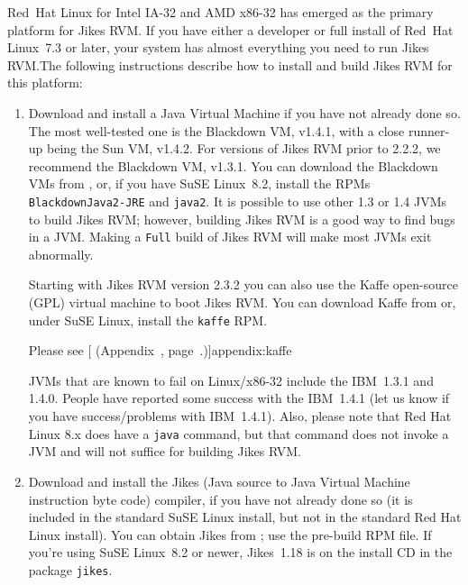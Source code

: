 Red~Hat\TMboth{} Linux\Rboth{} for Intel\Rboth{} IA-32 and AMD\Rboth{} x86-32 has emerged as the 
primary platform for Jikes\TMweb{} RVM.\@ 
If you have either a developer or full install of Red~Hat
Linux~7.3 or later, your system has almost everything you need
to run Jikes RVM.\@  The following instructions describe how to install
and build Jikes RVM for this platform:
\begin{enumerate}

%
%
%
\item Download and install a Java\TMweb{} Virtual Machine if you have not
already done so.  The most well-tested one is the Blackdown VM,
v1.4.1, with a close runner-up being the Sun VM, v1.4.2.
For versions of Jikes RVM prior to 2.2.2, we recommend
the Blackdown VM, v1.3.1.  You can download the Blackdown VMs from 
\xlink{{\tt \BlackdownURL}}{\BlackdownURL}, or, if you have SuSE
Linux~8.2, install the RPMs {\tt Black\-downJa\-va2-JRE} and {\tt java2}. 
It is possible to use other 1.3 or 1.4 JVMs to build Jikes RVM;
however, building Jikes RVM is a good way to find bugs in a JVM.\@
Making a {\tt Full} build of Jikes RVM will make most JVMs exit abnormally.

%
Starting with Jikes RVM version 2.3.2 you can also use the Kaffe
open-source (GPL) virtual machine to boot Jikes RVM.  You can download
Kaffe from \xlink{{\tt \KaffeURL}}{\KaffeURL} or, under SuSE Linux, install the 
{\tt kaffe} RPM.

Please see 
[ (Appendix~\Ref, page~\Pageref.)]{appendix:kaffe}


%
JVMs that are known to fail on Linux/x86-32 include the IBM\Rweb{}~1.3.1 and
1.4.0.  People have reported some success with the IBM~1.4.1 (let us
know if you have success/problems with IBM~1.4.1). Also, please note
that Red Hat Linux 8.x does have a {\tt java} command, but that command does not invoke a
JVM and will not suffice for building Jikes RVM.\@

%
\item Download and install the Jikes (Java source to Java Virtual
  Machine instruction byte code)
compiler, if you have not already 
done so (it is included in the standard SuSE Linux install, but not in
the standard Red Hat Linux install).  You can 
obtain Jikes from ;
use the pre-build RPM file.
If you're using SuSE Linux~8.2 or newer, Jikes~1.18 is on the install
CD in the package {\tt jikes}.


\end{enumerate}
